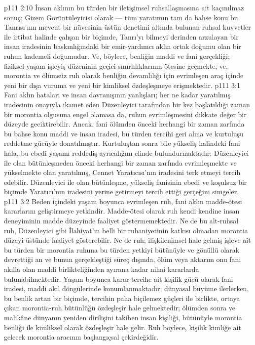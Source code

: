 \vs p111 2:10 İnsan aklının bu türden bir iletişimsel ruhsallaşmasına ait kaçınılmaz sonuç; Gizem Görüntüleyicisi olarak --- tüm yaratımın tam da bahse konu bu Tanrısı’nın mevcut bir nüvesinin üstün denetimi altında bulunan ruhsal kuvvetler ile irtibat halinde çalışan bir biçimde, Tanrı’yı bilmeyi derinden arzulayan bir insan iradesinin baskınlığındaki bir emir\hyp{}yardımcı aklın ortak doğumu olan bir ruhun kademeli doğumudur. Ve, böylece, benliğin maddi ve fani gerçekliği; fiziksel\hyp{}yaşam işleyiş düzeninin geçici sınırlılıklarının ötesine geçmekte, ve, morontia ve ölümsüz ruh olarak benliğin devamlılığı için evrimleşen araç içinde yeni bir dışa vuruma ve yeni bir kimliksel özdeşleşmeye erişmektedir.
\vs p111 3:1 Fani aklın hataları ve insan davranışının yanlışları; her ne kadar yaratılmış iradesinin onayıyla ikamet eden Düzenleyici tarafından bir kez başlatıldığı zaman bir morontia olgusuna engel olamasa da, ruhun evrimleşmesini dikkate değer bir düzeyde geciktirebilir. Ancak, fani ölümden önceki herhangi bir zaman zarfında bu bahse konu maddi ve insan iradesi, bu türden tercihi geri alma ve kurtuluşu reddetme gücüyle donatılmıştır. Kurtuluştan sonra bile yükseliş halindeki fani hala, bu ebedi yaşamı reddediş ayrıcalığını elinde bulundurmaktadır; Düzenleyici ile olan bütünleşmeden önceki herhangi bir zaman zarfında evrimleşmekte ve yükselmekte olan yaratılmış, Cennet Yaratıcısı’nın iradesini terk etmeyi tercih edebilir. Düzenleyici ile olan bütünleşme, yükseliş fanisinin ebedi ve koşulsuz bir biçimde Yaratıcı’nın iradesini yerine getirmeyi tercih ettiği gerçeğini simgeler.
\vs p111 3:2 Beden içindeki yaşam boyunca evrimleşen ruh, fani aklın madde\hyp{}ötesi kararlarını geliştirmeye yetkindir. Madde\hyp{}ötesi olarak ruh kendi kendine insan deneyiminin madde düzeyinde faaliyet göstermemektedir. Ne de bu alt\hyp{}ruhsal ruh, Düzenleyici gibi İlahiyat’ın belli bir ruhaniyetinin katkısı olmadan morontia düzeyi üstünde faaliyet gösterebilir. Ne de ruh; ilişkilenimsel hale gelmiş işleve ait bu türden bir morontia ruhuna bu türden yetkiyi bütünüyle ve gönüllü olarak devrettiği an ve bunun gerçekleştiği süreç dışında, ölüm veya aktarım onu fani akılla olan maddi birlikteliğinden ayırana kadar nihai kararlarda bulunabilmektedir. Yaşam boyunca karar\hyp{}tercihe ait kişilik gücü olarak fani iradesi, maddi akıl döngülerinde konumlanmaktadır; dünyasal büyüme ilerlerken, bu benlik artan bir biçimde, tercihin paha biçilemez güçleri ile birlikte, ortaya çıkan morontia\hyp{}ruh bütünlüğü özdeşleşir hale gelmektedir; ölümden sonra ve malikâne dünyanın yeniden dirilişini takiben insan kişiliği, bütünüyle morontia benliği ile kimliksel olarak özdeşleşir hale gelir. Ruh böylece, kişilik kimliğe ait gelecek morontia aracının başlangıçsal çekirdeğidir.
